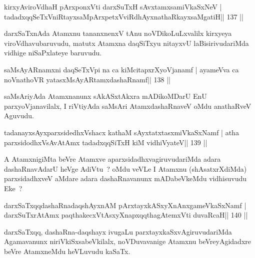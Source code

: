 
\begin{shl}
kirxyAviroVdhaH pArxponxVti darxSuTxH sAvxtamxsamiVkaSxNeV |
tadadxqqSeTxVniRtayxsaMpArxpetxVviRdhAyxnathaRkayxsaMgatiH\hfill || 137 ||
\end{shl}

\begin{artha}
darxSaTxnAda Atamxnu tananxnenxV tAnu noVDikoLuLxvalilx kirxyeya viroVdhavu\footnotemark[5] baruvudu, matutx Atamxna daqSiTxyu nitayxvU laBisirivudariMda vidhige niSaPxlateye baruvudu.
\end{artha}


\begin{shl}
saMsAyARnamxni daqSeTxV\s pi na ca kiMcitapxrXyoVjanamf |
ayameVva ca noV\s nathoVR yatasxMsAyARtamxdashaRnamf\hfill || 138 ||
\end{shl}

\begin{artha}
saMsAriyAda Atamxnanunx sAkASxtAkxra mADikoMDarU EnU parxyoVjanavilalx, I riVtiyAda saMsAri AtamxdashaRnaveV oMdu anathaRveV Aguvudu.
\end{artha}


\begin{shl}
tadanayxsAyxparxsidedhxVshacx kathaM sAyxtatxtasxmiVkaSxNamf |
atha parxsidodhxV\s sAvAtAmx tadadxqqSiTxH kiM vidhiVyateV\hfill || 139 ||
\end{shl}

\begin{artha}
A AtamxnigiMta beVre Atamxve aparxsidadhxvagiruvudariMda adara dashaRnavAdarU heVge AdiVtu~? oMdu veVLe I Atamxnu (shAsatxrXdiMda) parxsidadhxveV aMdare adara dashaRnavanunx mADabeVkeMdu vidhisuvudu Eke~? 
\end{artha}


\begin{shl}
darxSaTxqqdashaRnadaqshAyxnAM pArxtayxkASxyXnAnx\s\s gameVkaSxNamf |
darxSuTxrAtAmx paqthakecxVtAsxyXnapxqqthagAtemxVti duvaRcaH\hfill || 140 ||
\end{shl}

\begin{artha}
darxSaTxqq, dashaRna-daqshayx ivugaLu parxtayxkaSxvAgiruvudariMda Agamavanunx niriVkiSxsabeVkilalx, noVDuvavanige Atamxnu beVreyAgidadxre beVre AtamxneMdu heVLuvudu \footnotemark[5]kaSaTx.
\end{artha}

